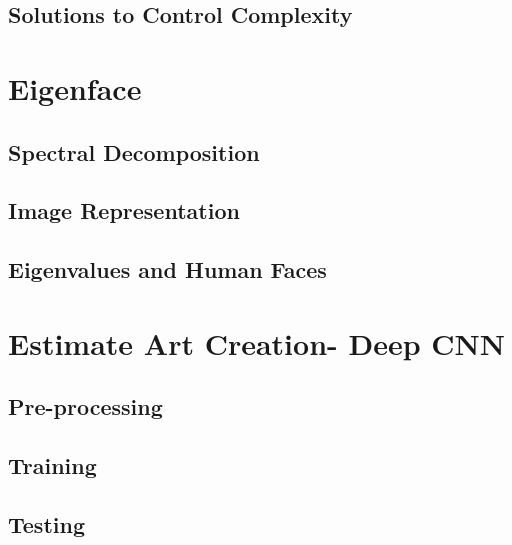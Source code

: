\documentclass{article}
\begin{document}
\subsection{Solutions to Control Complexity}

\section{Eigenface}
\subsection{Spectral Decomposition}
\subsection{Image Representation}
\subsection{Eigenvalues and Human Faces}

\section{Estimate Art Creation- Deep CNN}
\subsection{Pre-processing}
\subsection{Training}
\subsection{Testing}
\end{document}
